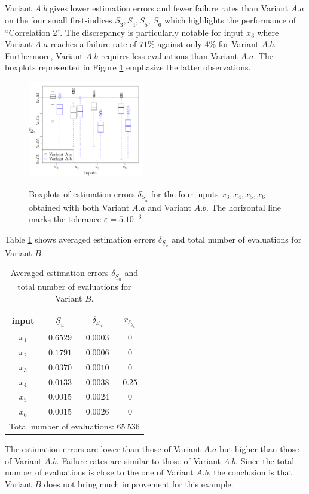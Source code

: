 Variant $A.b$ gives lower estimation errors and fewer failure rates than Variant $A.a$ on the four small first-indices $\underline{S}_3,\underline{S}_4,\underline{S}_5$, $\underline{S}_6$ which highlights the performance of ``Correlation 2''. The discrepancy is particularly notable for input $x_3$ where Variant $A.a$ reaches a failure rate of $71\%$ against only $4\%$ for Variant $A.b$. Furthermore, Variant $A.b$ requires less evaluations than Variant $A.a$. The boxplots represented in Figure \ref{boxplots.bratley} emphasize the latter observations.
\begin{figure}[!ht]
\caption{Boxplots of estimation errors $\delta_{\underline{S}_u}$ for the four inputs $x_3,x_4,x_5,x_6$ obtained with both Variant $A.a$ and Variant $A.b$. The horizontal line marks the tolerance $\varepsilon=5.10^{-3}$.}
\centering
\includegraphics[width=0.45\textwidth]{Images/boxplots_bis.pdf}
\label{boxplots.bratley}
\end{figure}

Table \ref{res.bratley.B} shows averaged estimation errors $\delta_{\underline{S}_u}$ and total number of evaluations for Variant $B$. 
\begin{table}[!ht]
\caption{Averaged estimation errors $\delta_{\underline{S}_u}$ and total number of evaluations for Variant $B$.}
\centering
\begin{tabular}{cccc}
\hline
 input & $\underline{S}_u$ & $\delta_{\underline{S}_u}$ & $r_{\delta_{\underline{S}_u}}$ \\ \hline
 $x_1$ & $0.6529$ &  $0.0003$ & $0$ \\ \hline
 $x_2$ & $0.1791$ &  $0.0006$ & $0$ \\ \hline
 $x_3$ & $0.0370$ &  $0.0010$ & $0$ \\ \hline
 $x_4$ & $0.0133$ &  $0.0038$ & $0.25$    \\ \hline
 $x_5$ & $0.0015$ & $0.0024$ & $0$  \\ \hline
 $x_6$ & $0.0015$ & $0.0026$ & $0$  \\ \hline \hline
\multicolumn{4}{l}{Total number of evaluations: $65 \ 536$}\\ \hline 
\end{tabular}
\label{res.bratley.B}
\end{table}
The estimation errors are lower than those of Variant $A.a$ but higher than those of Variant $A.b$. Failure rates are similar to those of Variant $A.b$. Since the total number of evaluations is close to the one of Variant $A.b$, the conclusion is that Variant $B$ does not bring much improvement for this example.
\bigskip

